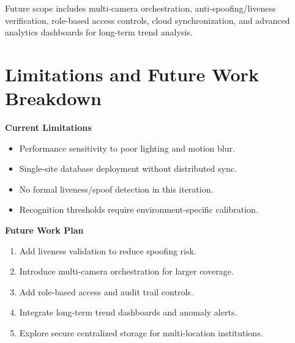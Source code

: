 \documentclass{fisatprojectfinal}
\begin{document}
Future scope includes multi-camera orchestration, anti-spoofing/liveness verification, role-based access controls, cloud synchronization, and advanced analytics dashboards for long-term trend analysis.

\section*{Limitations and Future Work Breakdown}
\textbf{Current Limitations}
\begin{itemize}
	\item Performance sensitivity to poor lighting and motion blur.
	\item Single-site database deployment without distributed sync.
	\item No formal liveness/spoof detection in this iteration.
	\item Recognition thresholds require environment-specific calibration.
\end{itemize}

\textbf{Future Work Plan}
\begin{enumerate}
	\item Add liveness validation to reduce spoofing risk.
	\item Introduce multi-camera orchestration for larger coverage.
	\item Add role-based access and audit trail controls.
	\item Integrate long-term trend dashboards and anomaly alerts.
	\item Explore secure centralized storage for multi-location institutions.
\end{enumerate}

\renewcommand\bibname{References}
{\thispagestyle{empty}}

\thispagestyle{empty}
\end{document}
